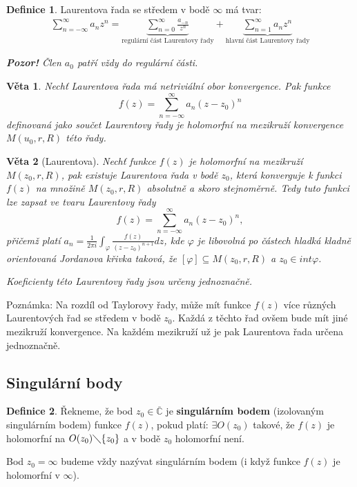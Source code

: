 \documentclass[a4]{report}
\newtheorem{theorem}{Věta}
\theoremstyle{definition}
\newtheorem{definition}{Definice}[section]
\begin{document}
\begin{definition}
Laurentova řada se středem v bodě $\infty$ má tvar:
\begin{align*}
\sum_{n=-\infty}^{\infty}a_nz^n=\underbrace{\sum_{n=0}^{\infty}\frac{a_{-n}}{z^n}}_{\text{regulární část Laurentovy řady}}+\underbrace{\sum_{n=1}^{\infty}a_nz^n}_{\text{hlavní část Laurentovy řady}}
\end{align*}
\end{definition}

\textit{\textbf{Pozor!} Člen $a_0$ patří vždy do regulární části.}

\begin{theorem}
Nechť Laurentova řada má netriviální obor konvergence. Pak funkce 
$$
f(z)=\sum_{n=-\infty}^{\infty} a_n (z-z_0)^n
$$
definovaná jako součet Laurentovy řady je holomorfní na mezikruží konvergence $M(u_0,r,R)$ této řady.
\end{theorem}
\begin{theorem}[Laurentova]
Nechť funkce $f(z)$ je holomorfní na mezikruží $M(z_0,r,R)$, pak existuje Laurentova řada v bodě $z_0$, která konverguje k funkci $f(z) $ na množině $M(z_0,r,R)$ absolutně a skoro stejnoměrně. Tedy tuto funkci lze zapsat ve tvaru Laurentovy řady $$f(z)=\sum_{n=-\infty}^{\infty}a_n(z-z_0)^n,$$přičemž platí $a_n=\frac{1}{2\pi i}\int_{\varphi}\frac{f(z)}{(z-z_0)^{n+1}}dz$, kde $\varphi$ je libovolná po částech hladká kladně orientovaná Jordanova křivka taková, že $[\varphi]\subseteq M(z_0,r,R)$ a $z_0\in int\varphi$.

Koeficienty této Laurentovy řady jsou určeny jednoznačně.
\end{theorem}

Poznámka: Na rozdíl od Taylorovy řady, může mít funkce $f(z)$ více různých Laurentových řad se středem v bodě $z_0$. Každá z těchto řad ovšem bude mít jiné mezikruží konvergence. Na každém mezikruží už je pak Laurentova řada určena jednoznačně.

\subsection{Singulární body}
\begin{definition}
Řekneme, že bod $z_0\in \overline{\mathbb{C}}$ je \textbf{singulárním bodem} (izolovaným singulárním bodem) funkce $f(z)$, pokud platí:
$\exists O(z_0)$ takové, že $f(z)$ je holomorfní na $O(z_0)\diagdown \{z_0\}$ a v bodě $z_0$ holomorfní není. 

Bod $z_0=\infty$ budeme vždy nazývat singulárním bodem (i když funkce $f(z)$ je holomorfní v $\infty$).
\end{definition}
\end{document}
